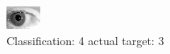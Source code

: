 \begin{figure}[h!]
\begin{center}
\includegraphics[width=0.60\columnwidth]{figures/ID212_class_4_target_3.png}
\end{center}
\caption{ Classification: 4 actual target: 3}
\label{fig:ID212_class_4_target_3}
\end{figure}
